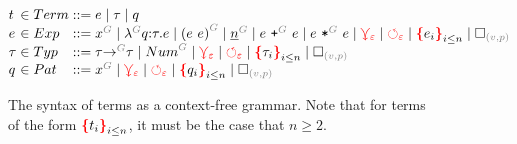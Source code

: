 \documentclass[nonacm, acmsmall, screen, review]{acmart}
\newcommand{\e}{\varepsilon}
\newcommand{\id}[1]{\textcolor{gray}{\ensuremath{#1}}}
\newcommand{\eid}[2]{{#2}^{\id{#1}}}
\newcommand{\eVar}[2]{\eid{#1}{#2}}
\newcommand{\eFun}[4]{\eid{#1}{\lambda}#2{:}#3{.}#4}
\newcommand{\eApp}[3]{\eid{#1}{\left(#2~#3\right)}}
\newcommand{\eNum}[2]{\eid{#1}{\underline{#2}}}
\newcommand{\ePlus}[3]{#2~\eid{#1}{\texttt{+}}~#3}
\newcommand{\eTimes}[3]{#2~\eid{#1}{\texttt{*}}~#3}
\newcommand{\pVar}[2]{\eid{#1}{#2}}
\newcommand{\tArrow}[3]{#2 \eid{#1}{\rightarrow} #3}
\newcommand{\tNum}[1]{\eid{#1}{Num}}
\newcommand{\conflictHole}[1]{%
{\noexpandarg\StrSubstitute{#1}{,}{\textcolor{red}{\,\textbf{|}\,}}[\myargs]%
{\textcolor{red}{\textbf{\{}}\myargs\textcolor{red}{\textbf{\}}}}}}%
\newcommand{\emptyHole}[2]{\square_{\id{(#1, #2)}}}
\newcommand{\multiVertex}[1]{\textcolor{red}{\ensuremath{\curlyveedownarrow_{#1}}}}
\newcommand{\cycleVertex}[1]{\textcolor{red}{\ensuremath{\circlearrowleft_{#1}}}}
\begin{document}


\begin{figure}
  \[
    \arraycolsep=0pt
    \begin{array}{lcllll}
      t & {}\in{} & Term & {}::={} &
        e
        \mid \tau
        \mid q
      \\
      e & {}\in{} & Exp & {}::={} &
        \eVar{G}{x}
        \mid \eFun{G}{q}{\tau}{e}
        \mid \eApp{G}{e}{e}
        \mid \eNum{G}{n}
        \mid \ePlus{G}{e}{e}
        \mid \eTimes{G}{e}{e}
        \mid \multiVertex{\e}
        \mid \cycleVertex{\e}
        \mid \conflictHole{e_i}_{i \leq n}
        \mid \emptyHole{v}{p}
      \\
      \tau & {}\in{} & Typ & {}::={} &
        \tArrow{G}{\tau}{\tau}
        \mid \tNum{G}
        \mid \multiVertex{\e}
        \mid \cycleVertex{\e}
        \mid \conflictHole{\tau_i}_{i \leq n}
        \mid \emptyHole{v}{p}
      \\
      q & {}\in{} & Pat{} & {}::={} &
        \pVar{G}{x}
        \mid \multiVertex{\e}
        \mid \cycleVertex{\e}
        \mid \conflictHole{q_i}_{i \leq n}
        \mid \emptyHole{v}{p}
      \\
    \end{array}
  \]  
  \caption{
    The syntax of terms as a context-free grammar.
    Note that for terms of the form $\protect\conflictHole{t_i}_{i \leq n}$,
    it must be the case that $n \geq 2$.
  }
  \label{fig:syntax}
\end{figure}



\end{document}
